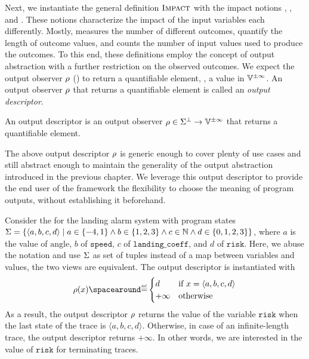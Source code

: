 Next, we instantiate the general definition $\textup{\textsc{Impact}}$ with the impact notions \outcomesname{}, \rangename{}, and \qusedname{}. These notions characterize the impact of the input variables each differently. Mostly, \outcomesname{} measures the number of different outcomes, \rangename{} quantify the length of outcome values, and \qusedname{} counts the number of input values used to produce the outcomes.
To this end, these definitions employ the concept of output abstraction with a further restriction on the observed outcomes. We expect the output observer $\rho$ () to return a quantifiable element, \ie{}, a value in $\mathbb{V}^{\pm \infty}$.
An output observer $\rho$ that returns a quantifiable element is called an \emph{output descriptor}.

\begin{definition}
  An \textup{output descriptor} is an output observer $\rho\in\Sigma^\bot\to\mathbb{V}^{\pm \infty}$ that returns a quantifiable element.
\end{definition}

The above output descriptor $\rho$ is generic enough to cover plenty of use cases and still abstract enough to maintain the generality of the output abstraction introduced in the previous chapter.
We leverage this output descriptor to provide the end user of the framework the flexibility to choose the meaning of program outputs, without establishing it beforehand.

\begin{example}
  Consider the  for the landing alarm system with program states $\Sigma=\{\langle a, b, c, d \rangle \mid a\in\{-4,1\}\land b\in\{1,2,3\}\land c\in\mathbb{N} \land d\in\{0,1,2,3\}\}$, where $a$ is the value of $\text{angle}$, $b$ of $\texttt{speed}$, $c$ of $\texttt{landing\_coeff}$, and $d$ of $\texttt{risk}$.
  Here, we abuse the notation and use $\Sigma$ as set of tuples instead of a map between variables and values, the two views are equivalent.
  The output descriptor is instantiated with
  \[
  \outputobs(x) \DefeQ \begin{cases}
    d & \text{if } x = \langle a, b, c, d \rangle \\
    +\infty & \text{otherwise}
  \end{cases}
  \]
  As a result, the output descriptor $\rho$ returns the value of the variable $\texttt{risk}$ when the last state of the trace is $\langle a, b, c, d \rangle$. Otherwise, in case of an infinite-length trace, the output descriptor returns $+\infty$.
  In other words, we are interested in the value of $\texttt{risk}$ for terminating traces.
\end{example}

